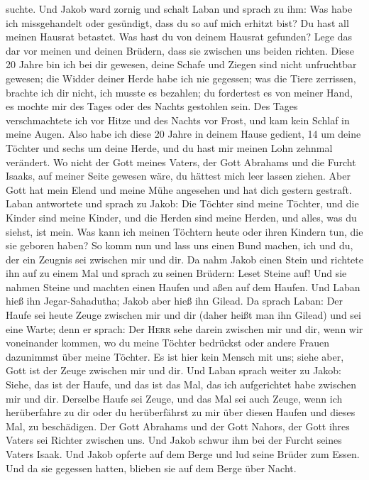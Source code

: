 suchte.  Und Jakob ward zornig und schalt Laban und
sprach zu ihm: Was habe ich missgehandelt oder gesündigt, dass du so auf
mich erhitzt bist?  Du hast all meinen Hausrat betastet.
Was hast du von deinem Hausrat gefunden? Lege das dar vor meinen und
deinen Brüdern, dass sie zwischen uns beiden richten. 
Diese 20 Jahre bin ich bei dir gewesen, deine Schafe und Ziegen sind
nicht unfruchtbar gewesen; die Widder deiner Herde habe ich nie
gegessen;  was die Tiere zerrissen, brachte ich dir
nicht, ich musste es bezahlen; du fordertest es von meiner Hand, es
mochte mir des Tages oder des Nachts gestohlen sein.  Des
Tages verschmachtete ich vor Hitze und des Nachts vor Frost, und kam
kein Schlaf in meine Augen.  Also habe ich diese 20 Jahre
in deinem Hause gedient, 14 um deine Töchter und sechs um deine Herde,
und du hast mir meinen Lohn zehnmal verändert.  Wo nicht
der Gott meines Vaters, der Gott Abrahams und die Furcht Isaaks, auf
meiner Seite gewesen wäre, du hättest mich leer lassen ziehen. Aber Gott
hat mein Elend und meine Mühe angesehen und hat dich gestern gestraft.
 Laban antwortete und sprach zu Jakob: Die Töchter sind
meine Töchter, und die Kinder sind meine Kinder, und die Herden sind
meine Herden, und alles, was du siehst, ist mein. Was kann ich meinen
Töchtern heute oder ihren Kindern tun, die sie geboren haben?
 So komm nun und lass uns einen Bund machen, ich und du,
der ein Zeugnis sei zwischen mir und dir.  Da nahm Jakob
einen Stein und richtete ihn auf zu einem Mal  und sprach
zu seinen Brüdern: Leset Steine auf! Und sie nahmen Steine und machten
einen Haufen und aßen auf dem Haufen.  Und Laban hieß ihn
Jegar-Sahadutha; Jakob aber hieß ihn Gilead.  Da sprach
Laban: Der Haufe sei heute Zeuge zwischen mir und dir (daher heißt man
ihn Gilead)  und sei eine Warte; denn er sprach: Der
\textsc{Herr} sehe darein zwischen mir und dir, wenn wir voneinander
kommen,  wo du meine Töchter bedrückst oder andere Frauen
dazunimmst über meine Töchter. Es ist hier kein Mensch mit uns; siehe
aber, Gott ist der Zeuge zwischen mir und dir.  Und Laban
sprach weiter zu Jakob: Siehe, das ist der Haufe, und das ist das Mal,
das ich aufgerichtet habe zwischen mir und dir.  Derselbe
Haufe sei Zeuge, und das Mal sei auch Zeuge, wenn ich herüberfahre zu
dir oder du herüberfährst zu mir über diesen Haufen und dieses Mal, zu
beschädigen.  Der Gott Abrahams und der Gott Nahors, der
Gott ihres Vaters sei Richter zwischen uns.  Und Jakob
schwur ihm bei der Furcht seines Vaters Isaak. Und Jakob opferte auf dem
Berge und lud seine Brüder zum Essen. Und da sie gegessen hatten,
blieben sie auf dem Berge über Nacht.

